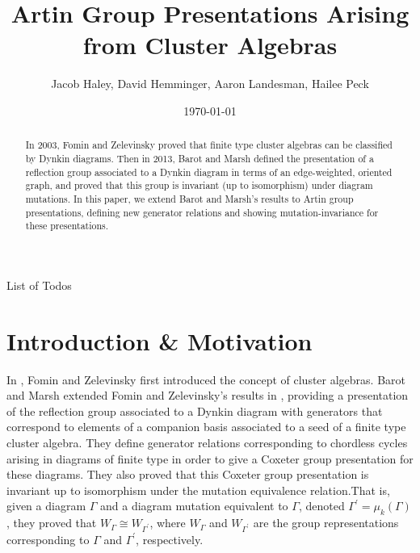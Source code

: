 \documentclass[11pt]{amsart}
\makeatletter
\theoremstyle{definition}
\def\listtodoname{List of Todos}
\def\listoftodos{\@starttoc{tdo}\listtodoname}
\makeatother
\begin{document}
\listoftodos




\title{Artin Group Presentations Arising from Cluster Algebras}
\author{Jacob Haley, David Hemminger, Aaron Landesman, Hailee Peck}
\address{Jacob: 225 St. Edward's Hall; Notre Dame, IN 46556 \\
Hailee: 1184 W Main St; Decatur, IL 62522}
\date{\today}

\begin{abstract}
In 2003, Fomin and Zelevinsky proved that finite type cluster algebras can be classified by Dynkin diagrams. Then in 2013, Barot and Marsh defined the presentation of a reflection group associated to a Dynkin diagram in terms of an edge-weighted, oriented graph, and proved that this group is invariant (up to isomorphism) under diagram mutations. In this paper, we extend Barot and Marsh's results to Artin group presentations, defining new generator relations and showing mutation-invariance for these presentations.
\end{abstract}

\maketitle

\section{Introduction \& Motivation}
\label{sec:Intro}


In \cite{FZ02}, Fomin and Zelevinsky first introduced the concept of cluster algebras. Barot and Marsh extended Fomin and Zelevinsky's results in \cite{BM13}, providing a presentation of the reflection group associated to a Dynkin diagram with generators that correspond to elements of a companion basis associated to a seed of a finite type cluster algebra. They define generator relations corresponding to chordless cycles arising in diagrams of finite type in order to give a Coxeter group presentation for these diagrams. They also proved that this Coxeter group presentation is invariant up to isomorphism under the mutation equivalence relation.That is, given a diagram $\Gamma$ and a diagram mutation equivalent to $\Gamma$, denoted $\Gamma^{\prime} = \mu_k(\Gamma)$, they proved that $W_{\Gamma} \cong W_{\Gamma^{\prime}}$, where $W_{\Gamma}$ and $W_{\Gamma^{\prime}}$ are the group representations corresponding to $\Gamma$ and $\Gamma^{\prime}$, respectively.
\end{document}
